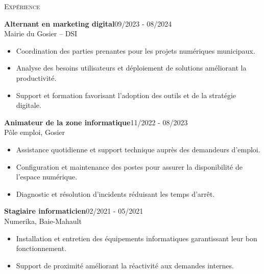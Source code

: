 \documentclass[11pt,a4paper]{article}
\newcommand{\headright}[1]{\vspace*{2.5ex}\textsc{\Large\color{cvblue}#1}\par%
  \vspace*{-2ex}{\color{cvblue}\hrulefill}\par}
\begin{document}
\begin{minipage}[t]{0.56\textwidth}
  \setlength{\parskip}{0.8ex}
  \vspace{2ex}

  \headright{Expérience}
  \colorbox{maincolor}{%
  \begin{minipage}{\linewidth}
    \noindent
    \textbf{Alternant en marketing digital}\hfill 09/2023 - 08/2024\\
    Mairie du Gosier – DSI\\[-0.3em]
    \begin{itemize}[leftmargin=*]
      \item Coordination des parties prenantes pour les projets numériques municipaux. \item Analyse des besoins utilisateurs et déploiement de solutions améliorant la productivité. \item Support et formation favorisant l’adoption des outils et de la stratégie digitale.
    \end{itemize}
  \end{minipage}}

\vspace{3mm}

\colorbox{maincolor}{%
  \begin{minipage}{\linewidth}
    \noindent
    \textbf{Animateur de la zone informatique}\hfill 11/2022 - 08/2023\\
    Pôle emploi, Gosier\\[-0.3em]
    \begin{itemize}[leftmargin=*]
      \item Assistance quotidienne et support technique auprès des demandeurs d’emploi. \item Configuration et maintenance des postes pour assurer la disponibilité de l’espace numérique. \item Diagnostic et résolution d’incidents réduisant les temps d’arrêt.
    \end{itemize}
  \end{minipage}}

\vspace{3mm}

\colorbox{maincolor}{%
  \begin{minipage}{\linewidth}
    \noindent
    \textbf{Stagiaire informaticien}\hfill 02/2021 - 05/2021\\
    Numerika, Baie-Mahault\\[-0.3em]
    \begin{itemize}[leftmargin=*]
      \item Installation et entretien des équipements informatiques garantissant leur bon fonctionnement. \item Support de proximité améliorant la réactivité aux demandes internes.
    \end{itemize}
  \end{minipage}}        %


\end{minipage}
\end{document}
